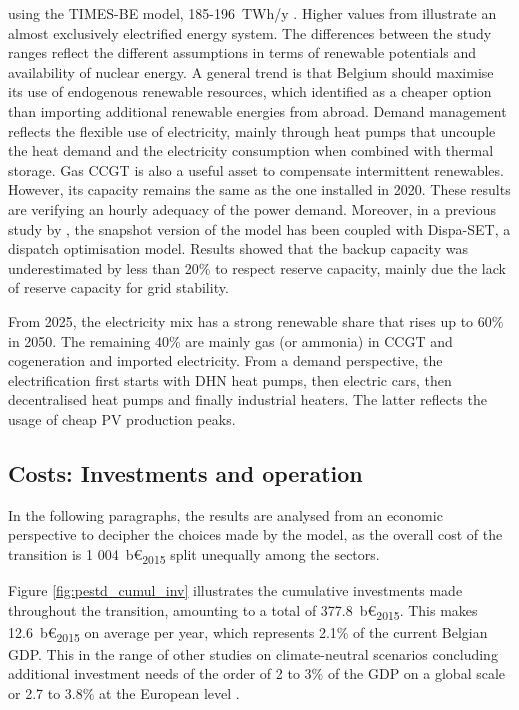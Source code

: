 using the TIMES-BE model, 185-196~TWh/y \cite{PATHS2050}. Higher values from \citet{Devogelaer2013} illustrate an almost exclusively electrified energy system. The differences between the study ranges reflect the different assumptions in terms of renewable potentials and availability of nuclear energy. A general trend is that Belgium should maximise its use of endogenous renewable resources, which \citet{dubois2023multi} identified as a cheaper option than importing additional renewable energies from abroad. Demand management reflects the flexible use of electricity, mainly through heat pumps that uncouple the heat demand and the electricity consumption when combined with thermal storage. Gas \gls{CCGT} is also a useful asset to compensate intermittent renewables. However, its capacity remains the same as the one installed in 2020. These results are verifying an hourly adequacy of the power demand. Moreover, in a previous study by \citet{pavivcevic2022bidirectionnal}, the snapshot version of the model has been coupled with Dispa-SET, a dispatch optimisation model. Results showed that the backup capacity was underestimated by less than 20\% to respect reserve capacity, mainly due the lack of reserve capacity for grid stability.  

From 2025, the electricity mix has a strong renewable share that rises up to 60\% in 2050. The remaining 40\% are mainly gas (or ammonia) in \gls{CCGT} and cogeneration and imported electricity. From a demand perspective, the electrification first starts with \gls{DHN} heat pumps, then electric cars, then decentralised heat pumps and finally industrial heaters. The latter reflects the usage of cheap \gls{PV} production peaks. 

\subsection{Costs: Investments and operation}

In the following paragraphs, the results are analysed from an economic perspective to decipher the choices made by the model, as the overall cost of the transition is 1 004~b€\textsubscript{2015} split unequally among the sectors. 

Figure \ref{fig:pestd_cumul_inv} illustrates the cumulative investments made throughout the transition, amounting to a total of 377.8~b€\textsubscript{2015}. This makes 12.6~b€\textsubscript{2015} on average per year, which represents 2.1\% of the current Belgian \gls{GDP}. This in the range of other studies on climate-neutral scenarios concluding additional investment needs of the order of 2 to 3\% of the \gls{GDP} on a global scale \cite{IEA2021,IRENA2021} or 2.7 to 3.8\% at the European level \cite{Widuto2023}.

